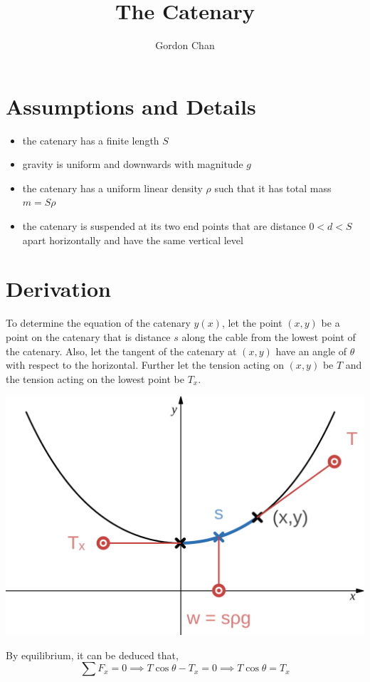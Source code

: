 \documentclass[a4paper]{article}
\title{The Catenary}
\author{Gordon Chan}
\begin{document}
\maketitle
\section{Assumptions and Details}
\begin{itemize}
    \item the catenary has a finite length \(S\)
    \item gravity is uniform and downwards with magnitude \(g\)
    \item the catenary has a uniform linear density \(\rho\) such that
        it has total mass \(m=S\rho\)
    \item the catenary is suspended at its two end points
    that are distance \(0<d<S\) apart horizontally and have the same vertical level
\end{itemize}

\section{Derivation}
To determine the equation of the catenary \(y(x)\), 
let the point \((x,y)\) be a point on the catenary that is distance \(s\) 
along the cable from the lowest point of the catenary. 
Also, let the tangent of the catenary at \((x,y)\) have an angle of \(\theta\)
with respect to the horizontal.
Further let the tension acting on \((x,y)\) be \(T\)
and the tension acting on the lowest point be \(T_x\).

\includegraphics[width=.9\textwidth]{catenary.png}

By equilibrium, it can be deduced that,
\begin{equation}
    \sum F_x=0\implies T\cos\theta-T_x=0\implies T\cos\theta=T_x
\end{equation}
\end{document}
